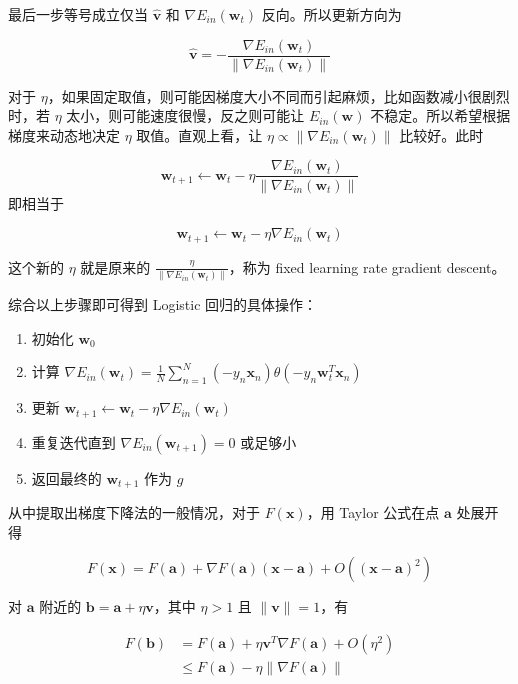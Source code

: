 \documentclass[a4paper]{article}
\begin{document}
最后一步等号成立仅当 $\hat{\mathbf{v}}$ 和 $\nabla E_{in}(\mathbf{w}_t)$ 反向。所以更新方向为

$$\hat{\mathbf{v}} = -\frac{\nabla E_{in}(\mathbf{w}_t)}{\|\nabla E_{in}(\mathbf{w}_t)\|}$$

对于 $\eta$，如果固定取值，则可能因梯度大小不同而引起麻烦，比如函数减小很剧烈时，若 $\eta$ 太小，则可能速度很慢，反之则可能让 $E_{in}(\mathbf{w})$ 不稳定。所以希望根据梯度来动态地决定 $\eta$ 取值。直观上看，让 $\eta \propto \|\nabla E_{in}(\mathbf{w}_t)\|$ 比较好。此时

$$\mathbf{w}_{t+1} \leftarrow \mathbf{w}_t - \eta\frac{\nabla E_{in}(\mathbf{w}_t)}{\|\nabla E_{in}(\mathbf{w}_t)\|}$$ 即相当于

$$\mathbf{w}_{t+1} \leftarrow \mathbf{w}_t - \eta\nabla E_{in}(\mathbf{w}_t)$$

这个新的 $\eta$ 就是原来的 $\displaystyle\frac{\eta}{\|\nabla E_{in}(\mathbf{w}_t)\|}$，称为 fixed learning rate gradient descent。

综合以上步骤即可得到 Logistic 回归的具体操作：

\begin{enumerate}
  \item 初始化 $\mathbf{w}_0$
  \item 计算 $\displaystyle \nabla E_{in}(\mathbf{w}_t) = \frac{1}{N}\sum_{n=1}^{N}(-y_n\mathbf{x}_n) \theta(-y_n\mathbf{w}_t^T\mathbf{x}_n)$
  \item 更新 $\mathbf{w}_{t+1} \leftarrow \mathbf{w}_t - \eta\nabla E_{in}(\mathbf{w}_t)$
  \item 重复迭代直到 $\nabla E_{in}(\mathbf{w}_{t+1}) = 0$ 或足够小
  \item 返回最终的 $\mathbf{w}_{t+1}$ 作为 $g$
\end{enumerate}


从中提取出梯度下降法的一般情况，对于 $F(\mathbf{x})$，用 Taylor 公式在点 $\mathbf{a}$ 处展开得

$$F(\mathbf{x}) = F(\mathbf{a}) + \nabla F(\mathbf{a})(\mathbf{x - a}) + O((\mathbf{x - a})^2)$$

对 $\mathbf{a}$ 附近的 $\mathbf{b} = \mathbf{a} + \eta\mathbf{v}$，其中 $\eta > 1$ 且 $\|\mathbf{v}\| = 1$，有

\begin{equation}
\begin{aligned}
F(\mathbf{b}) &= F(\mathbf{a}) + \eta\mathbf{v}^T\nabla F(\mathbf{a}) + O(\eta^2) \\
              &\le F(\mathbf{a}) - \eta\|\nabla F(\mathbf{a})\|
\end{aligned}
\end{equation}
\end{document}
